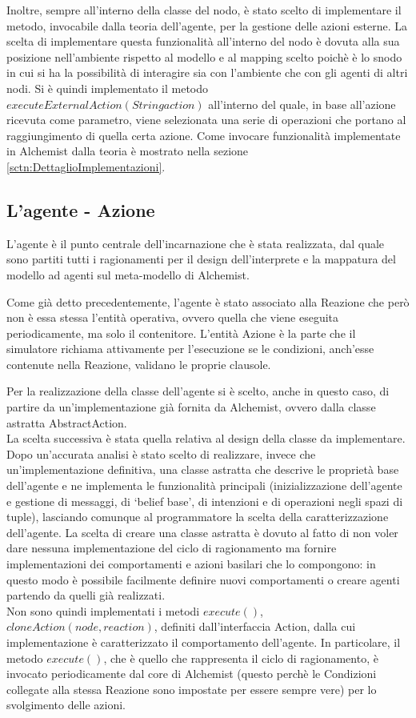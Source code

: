 Inoltre, sempre all'interno della classe del nodo, è stato scelto di implementare il metodo, invocabile dalla teoria dell'agente, per la gestione delle azioni esterne.
La scelta di implementare questa funzionalità all'interno del nodo è dovuta alla sua posizione nell'ambiente rispetto al modello e al mapping scelto poichè è lo snodo in cui si ha la possibilità di interagire sia con l'ambiente che con gli agenti di altri nodi. Si è quindi implementato il metodo $executeExternalAction(String action)$ all'interno del quale, in base all'azione ricevuta come parametro, viene selezionata una serie di operazioni che portano al raggiungimento di quella certa azione. Come invocare funzionalità implementate in Alchemist dalla teoria è mostrato nella sezione \ref{sctn:DettaglioImplementazioni}.

\subsection{L'agente - Azione}\label{sctn:AbstractAgent}
L'agente è il punto centrale dell'incarnazione che è stata realizzata, dal quale sono partiti tutti i ragionamenti per il design dell'interprete e la mappatura del modello ad agenti sul meta-modello di Alchemist.

Come già detto precedentemente, l'agente è stato associato alla Reazione che però non è essa stessa l'entità operativa, ovvero quella che viene eseguita periodicamente, ma solo il contenitore. L'entità Azione è la parte che il simulatore richiama attivamente per l'esecuzione se le condizioni, anch'esse contenute nella Reazione, validano le proprie clausole.

Per la realizzazione della classe dell'agente si è scelto, anche in questo caso, di partire da un'implementazione già fornita da Alchemist, ovvero dalla classe astratta AbstractAction.
\\
La scelta successiva è stata quella relativa al design della classe da implementare. Dopo un'accurata analisi è stato scelto di realizzare, invece che un'implementazione definitiva, una classe astratta che descrive le proprietà base dell'agente e ne implementa le funzionalità principali (inizializzazione dell'agente e gestione di messaggi, di `belief base', di intenzioni e di operazioni negli spazi di tuple), lasciando comunque al programmatore la scelta della caratterizzazione dell'agente. La scelta di creare una classe astratta è dovuto al fatto di non voler dare nessuna implementazione del ciclo di ragionamento ma fornire implementazioni dei comportamenti e azioni basilari che lo compongono: in questo modo è possibile facilmente definire nuovi comportamenti o creare agenti partendo da quelli già realizzati.
\\
Non sono quindi implementati i metodi $execute()$, $cloneAction(node, reaction)$, definiti dall'interfaccia Action, dalla cui implementazione è caratterizzato il comportamento dell'agente. In particolare, il metodo $execute()$, che è quello che rappresenta il ciclo di ragionamento, è invocato periodicamente dal core di Alchemist (questo perchè le Condizioni collegate alla stessa Reazione sono impostate per essere sempre vere) per lo svolgimento delle azioni.

